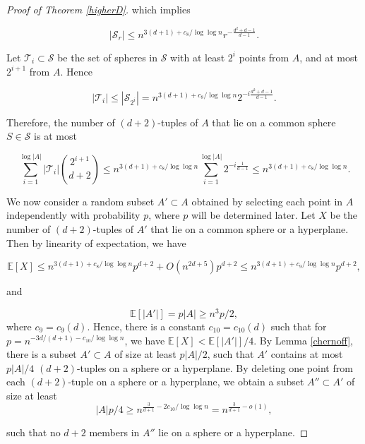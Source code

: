 \documentclass[11pt]{article}
\theoremstyle{plain}
\theoremstyle{definition}
\theoremstyle{remark}
\begin{document}
\begin{proof}[Proof of Theorem \ref{higherD}]
    \noindent which implies 
    
$$|\mathcal{S}_r| \leq n^{3(d+1)+c_8/\log\log n} r^{-\frac{d^2+d-1}{d-1}}.$$

Let $\mathcal{T}_i\subset \mathcal{S}$ be the set of spheres in $\mathcal{S}$ with at least $2^i$ points from $A$, and at most $2^{i +1}$ from $A$.  Hence

$$|\mathcal{T}_i| \leq |\mathcal{S}_{2^i}| = n^{3(d+1)+c_8/\log\log n} 2^{-i\frac{d^2+d-1}{d-1}}.$$

\noindent Therefore, the number of $(d+2)$-tuples of $A$ that lie on a common sphere $S \in \mathcal{S}$ is at most


$$\sum\limits_{i = 1}^{\log |A|} |\mathcal{T}_i|\binom{2^{i + 1}}{d+2} \leq n^{3(d+1)+c_8/\log\log n}\sum\limits_{i = 1}^{\log |A|}  2^{-i\frac{1}{d-1}} \leq n^{3(d+1)+c_8/\log\log n}. $$

 

We now consider a random subset $A'\subset A$ obtained by selecting each point in $A$ independently with probability $p$, where $p$ will be determined later. Let $X$ be the number of $(d+2)$-tuples of $A'$ that lie on a common sphere or a hyperplane.  Then by linearity of expectation, we have


$$\mathbb{E}[X] \leq n^{3(d+1)+c_8/\log\log n}p^{d+2} + O(n^{2d + 5})p^{d+2} \leq n^{3(d+1)+c_9/\log\log n}p^{d+2},$$

\noindent and

$$\mathbb{E}[|A'|] = p|A|\geq n^3p/2,$$where $c_9 = c_9(d)$.  Hence, there is a constant $c_{10} = c_{10}(d)$ such that for $p = n^{-3d/(d+1) - c_{10}/\log\log n}$, we have $\mathbb{E}[X] < \mathbb{E}[|A'|]/4$.  By Lemma \ref{chernoff}, there is a subset $A'\subset A$ of size at least $p|A|/2$, such that $A'$ contains at most $p|A|/4$ $(d+2)$-tuples on a sphere or a hyperplane.  By deleting one point from each $(d+2)$-tuple on a sphere or a hyperplane, we obtain a subset $A''\subset A'$ of size at least
$$|A|p/4 \geq n^{\frac{3}{d+ 1} - 2c_{10}/\log\log n} = n^{\frac{3}{d+ 1} - o(1)},$$

\noindent such that no $d+2$ members in $A''$ lie on a sphere or a hyperplane.\end{proof}









 

 
\end{document}
